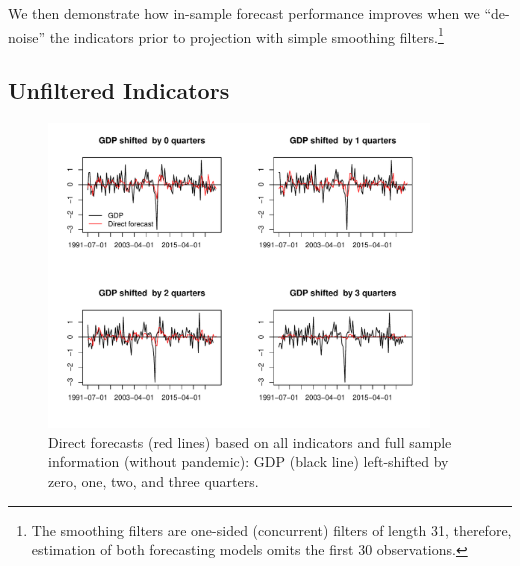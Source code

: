 \documentclass[11pt,a4paper]{article}
\begin{document}
We then demonstrate how in-sample forecast performance improves when we ``de-noise'' the indicators prior to projection with simple smoothing filters.\footnote{The smoothing filters are one-sided (concurrent) filters of length 31, therefore, estimation of both forecasting models omits the first 30 observations.}

\subsection{Unfiltered Indicators}\label{cdf}


\begin{figure}[H]
    \begin{center}
        \includegraphics[width=0.9\textwidth]{./Figures/direct_wc_all.pdf}
        \caption{Direct forecasts (red lines) based on all indicators and full sample information (without pandemic): GDP (black line) left-shifted  by zero, one, two, and three quarters.
        \label{direct_wc}}
    \end{center}
\end{figure}
\end{document}
